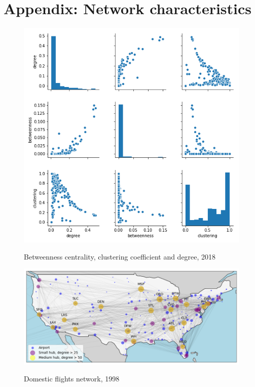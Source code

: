 \section{Appendix: Network characteristics}
\label{app: Network characteristics}
\begin{figure}[H]
  \centering
  \caption{Betweenness centrality, clustering coefficient and degree, 2018}
    \includegraphics[width=1 \textwidth]{Exam/Figures/NxPairPlot.png}
  \label{fig:Btwns_CC}
\end{figure}

\begin{figure}[H]
  \centering
  \caption{Domestic flights network, 1998}
    \includegraphics[width=1. \textwidth]{Exam/Figures/map_general_98}
    \vspace{-0.7cm}
  \label{fig:map_general_98}
\end{figure}

